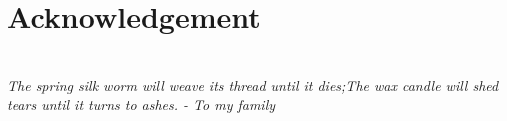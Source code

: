 \documentclass[logos]{orsay-thesis}  %
\author{Weiya Chen}
\begin{document}

\pagestyle{empty}

\dominitoc %

\pagebreak\strut
\newpage
\chapter*{Acknowledgement}

\clearpage

\chapter*{}
\thispagestyle{empty}
\textit{\hfill The spring silk worm \newline \null\hfill will weave its thread until it dies;\newline\newline \null\hfill The wax candle \newline \null\hfill will shed tears until it turns to ashes. \newline\newline \null\hfill - To my family}

\chapter*{} %





\tableofcontents
\mtcaddchapter


\pagestyle{fancy}
\end{document}
